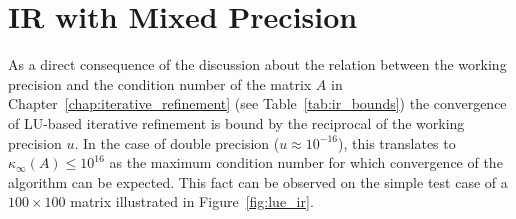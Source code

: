 \section{IR with Mixed Precision}
\label{sec:mixed_precision}

As a direct consequence of the discussion about the relation between the working precision and the condition number of the matrix $A$ in Chapter~\hyperref[chap:iterative_refinement]{\ref{chap:iterative_refinement}} (see Table~\hyperref[tab:ir_bounds]{\ref{tab:ir_bounds}}) the convergence of LU-based iterative refinement is bound by the reciprocal of the working precision $u$. In the case of double precision ($u \approx 10^{-16}$), this translates to $\kappa_\infty(A) \leq 10^{16}$ as the maximum condition number for which convergence of the algorithm can be expected. This fact can be observed on the simple test case of a $100 \times 100$ matrix illustrated in Figure~\hyperref[fig:lue_ir]{\ref{fig:lue_ir}}.

